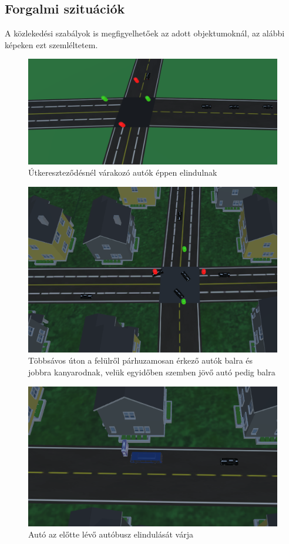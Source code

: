 \subsection{Forgalmi szituációk}
A közlekedési szabályok is megfigyelhetőek az adott objektumoknál, az alábbi képeken ezt szemléltetem.
\begin{figure}[H]
\includegraphics[width=\linewidth]{trafficLight.png}
\caption{Útkereszteződésnél várakozó autók éppen elindulnak}
\label{fig:xroadlight}
\end{figure}
\begin{figure}[H]
\includegraphics[width=\linewidth]{smalltowntraffic.png}
\caption{Többsávos úton a felülről párhuzamosan érkező autók balra és jobbra kanyarodnak, velük egyidőben szemben jövő autó pedig balra}
\label{fig:multilane}
\end{figure}
\begin{figure}[H]
\includegraphics[width=\linewidth]{carwaiting.png}
\caption{Autó az előtte lévő autóbusz elindulását várja}
\label{fig:waiting}
\end{figure}

